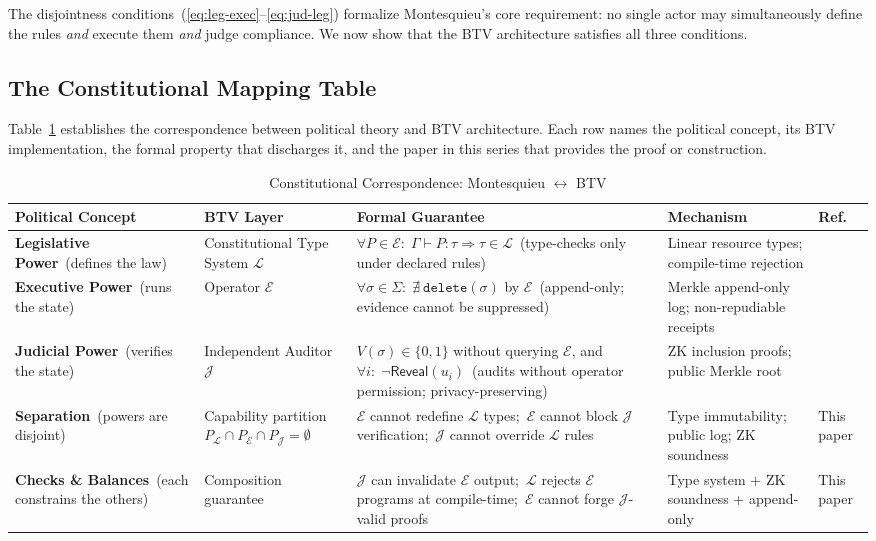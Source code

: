 The disjointness conditions~(\ref{eq:leg-exec}--\ref{eq:jud-leg})
formalize Montesquieu's core requirement: no single actor may
simultaneously define the rules \emph{and} execute them \emph{and}
judge compliance. We now show that the BTV architecture satisfies
all three conditions.

\subsection{The Constitutional Mapping Table}
\label{subsec:table}

Table~\ref{tab:mapping} establishes the correspondence between
political theory and BTV architecture. Each row names the political
concept, its BTV implementation, the formal property that discharges
it, and the paper in this series that provides the proof or
construction.

\begin{table}[t]
\centering
\caption{Constitutional Correspondence: Montesquieu $\leftrightarrow$ BTV}
\label{tab:mapping}
\begin{tabular}{p{2.8cm} p{3.5cm} p{4.5cm} p{2.8cm} p{1.5cm}}
\toprule
\textbf{Political Concept} &
\textbf{BTV Layer} &
\textbf{Formal Guarantee} &
\textbf{Mechanism} &
\textbf{Ref.} \\
\midrule
\textbf{Legislative Power}\ (defines the law) &
Constitutional Type System $\mathcal{L}$ &
$\forall P \in \mathcal{E}:\; \Gamma \vdash P : \tau \Rightarrow \tau \in \mathcal{L}$\ (type-checks only under declared rules) &
Linear resource types; compile-time rejection &
\cite{btv2026} \\
\addlinespace
\textbf{Executive Power}\ (runs the state) &
Operator $\mathcal{E}$ &
$\forall \sigma \in \Sigma:\; \nexists\ \mathtt{delete}(\sigma)$ by $\mathcal{E}$\ (append-only; evidence cannot be suppressed) &
Merkle append-only log; non-repudiable receipts &
\cite{btv-t-repo} \\
\addlinespace
\textbf{Judicial Power}\ (verifies the state) &
Independent Auditor $\mathcal{J}$ &
$V(\sigma) \in \{0,1\}$ without querying $\mathcal{E}$, and\ $\forall i:\; \neg\mathsf{Reveal}(u_i)$\ (audits without operator permission; privacy-preserving) &
ZK inclusion proofs; public Merkle root &
\cite{btv-ar2026} \\
\addlinespace
\textbf{Separation}\ (powers are disjoint) &
Capability partition $P_{\mathcal{L}} \cap P_{\mathcal{E}} \cap P_{\mathcal{J}} = \emptyset$ &
$\mathcal{E}$ cannot redefine $\mathcal{L}$ types;\ $\mathcal{E}$ cannot block $\mathcal{J}$ verification;\ $\mathcal{J}$ cannot override $\mathcal{L}$ rules &
Type immutability; public log; ZK soundness &
This paper \\
\addlinespace
\textbf{Checks \& Balances}\ (each constrains the others) &
Composition guarantee &
$\mathcal{J}$ can invalidate $\mathcal{E}$ output;\ $\mathcal{L}$ rejects $\mathcal{E}$ programs at compile-time;\ $\mathcal{E}$ cannot forge $\mathcal{J}$-valid proofs &
Type system + ZK soundness + append-only &
This paper \\
\bottomrule
\end{tabular}
\end{table}

